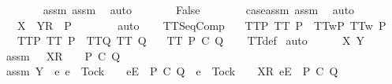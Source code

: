 \begin{isabellebody}
\ \ \ \ \ \ \isamarkupfalse%
\ assm{}\ assm{}\ \isamarkupfalse%
\ auto\isanewline
\ \ \ \ \isamarkupfalse%
\ \isamarkupfalse%
\ {\isachardoublequoteopen}False{\isachardoublequoteclose}\isanewline
\ \ \ \ \ \ \isamarkupfalse%
\ case{\isacharunderscore}assm\ assm{}\ \isamarkupfalse%
\ auto\isanewline
\ \ \ \ \isamarkupfalse%
\ \isamarkupfalse%
\ {\isachardoublequoteopen}{\isasymrho}\ {\isacharat}\ {\isacharbrackleft}{\isacharbrackleft}X\ {\isasymunion}\ Y{\isacharbrackright}\isactrlsub R{\isacharbrackright}\ {\isasymin}\ P{\isachardoublequoteclose}\isanewline
\ \ \ \ \ \ \isamarkupfalse%
\ auto\isanewline
\ \ \isamarkupfalse%
\isanewline
{}\isamarkupfalse%
%
\endisatagproof
{\isafoldproof}%
%
\isadelimproof
\isanewline
%
\endisadelimproof
\isanewline
{}\isamarkupfalse%
\ TT{}{\isacharunderscore}SeqComp{\isacharcolon}\isanewline
\ \ \ TT{}{\isacharunderscore}P{\isacharcolon}\ {\isachardoublequoteopen}TT{}\ P{\isachardoublequoteclose}\ \ TT{}w{\isacharunderscore}P{\isacharcolon}\ {\isachardoublequoteopen}TT{}w\ P{\isachardoublequoteclose}\isanewline
\ \ \ TT{}{\isacharunderscore}P{\isacharcolon}\ {\isachardoublequoteopen}TT{}\ P{\isachardoublequoteclose}\ \ TT{}{\isacharunderscore}Q{\isacharcolon}\ {\isachardoublequoteopen}TT{}\ Q{\isachardoublequoteclose}\isanewline
\ \ \ {\isachardoublequoteopen}TT{}\ {\isacharparenleft}P\ {\isacharsemicolon}\isactrlsub C\ Q{\isacharparenright}{\isachardoublequoteclose}\isanewline
%
\isadelimproof
\ \ %
\endisadelimproof
%
\isatagproof
{}\isamarkupfalse%
\ TT{}{\isacharunderscore}def\isanewline
{}\isamarkupfalse%
\ auto\isanewline
\ \ \isamarkupfalse%
\ {\isasymrho}\ {\isasymsigma}\ X\ Y\isanewline
\ \ \isamarkupfalse%
\ assm{}{\isacharcolon}\ {\isachardoublequoteopen}{\isasymrho}\ {\isacharat}\ {\isacharbrackleft}X{\isacharbrackright}\isactrlsub R\ {\isacharhash}\ {\isasymsigma}\ {\isasymin}\ P\ {\isacharsemicolon}\isactrlsub C\ Q{\isachardoublequoteclose}\isanewline
\ \ \isamarkupfalse%
\ assm{}{\isacharcolon}\ {\isachardoublequoteopen}Y\ {\isasyminter}\ {\isacharbraceleft}e{\isachardot}\ e\ {\isasymnoteq}\ Tock\ {\isasymand}\ {\isasymrho}\ {\isacharat}\ {\isacharbrackleft}{\isacharbrackleft}e{\isacharbrackright}\isactrlsub E{\isacharbrackright}\ {\isasymin}\ P\ {\isacharsemicolon}\isactrlsub C\ Q\ {\isasymor}\ e\ {\isacharequal}\ Tock\ {\isasymand}\ {\isasymrho}\ {\isacharat}\ {\isacharbrackleft}{\isacharbrackleft}X{\isacharbrackright}\isactrlsub R{\isacharcomma}\ {\isacharbrackleft}e{\isacharbrackright}\isactrlsub E{\isacharbrackright}\ {\isasymin}\ P\ {\isacharsemicolon}\isactrlsub C\ Q{\isacharbraceright}\ {\isacharequal}\ {\isacharbraceleft}{\isacharbraceright}{\isachardoublequoteclose}\isanewline

\end{isabellebody}
